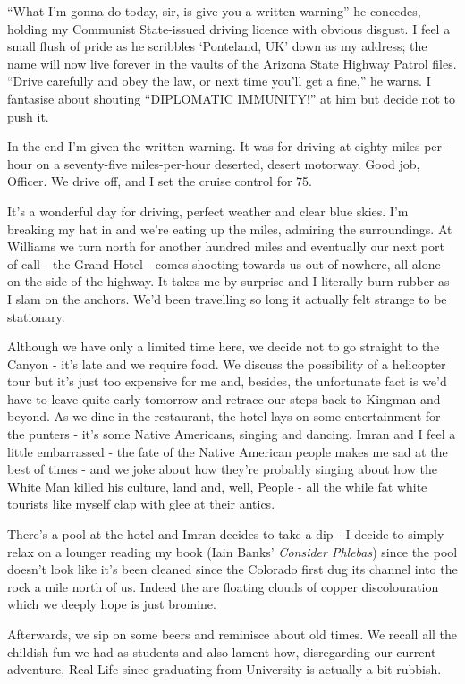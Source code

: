 \documentclass[a5paper,titlepage,11pt]{book}
\begin{document}
``What I'm gonna do today, sir, is give you a written warning'' he concedes, holding my Communist State-issued driving licence with obvious disgust.  I feel a small flush of pride as he scribbles `Ponteland, UK' down as my address; the name will now live forever in the vaults of the Arizona State Highway Patrol files.  ``Drive carefully and obey the law, or next time you'll get a fine,'' he warns.  I fantasise about shouting ``DIPLOMATIC IMMUNITY!'' at him but decide not to push it.

In the end I'm given the written warning.  It was for driving at eighty miles-per-hour on a seventy-five miles-per-hour deserted, desert motorway.  Good job, Officer.  We drive off, and I set the cruise control for 75.

It's a wonderful day for driving, perfect weather and clear blue skies.  I'm breaking my hat in and we're eating up the miles, admiring the surroundings.  At Williams we turn north for another hundred miles and eventually our next port of call - the Grand Hotel - comes shooting towards us out of nowhere, all alone on the side of the highway.  It takes me by surprise and I literally burn rubber as I slam on the anchors.  We'd been travelling so long it actually felt strange to be stationary.

Although we have only a limited time here, we decide not to go straight to the Canyon - it's late and we require food.  We discuss the possibility of a helicopter tour but it's just too expensive for me and, besides, the unfortunate fact is we'd have to leave quite early tomorrow and retrace our steps back to Kingman and beyond.  As we dine in the restaurant, the hotel lays on some entertainment for the punters - it's some Native Americans, singing and dancing.  Imran and I feel a little embarrassed - the fate of the Native American people makes me sad at the best of times - and we joke about how they're probably singing about how the White Man killed his culture, land and, well, People - all the while fat white tourists like myself clap with glee at their antics.

There's a pool at the hotel and Imran decides to take a dip - I decide to simply relax on a lounger reading my book (Iain Banks' \emph{Consider Phlebas}) since the pool doesn't look like it's been cleaned since the Colorado first dug its channel into the rock a mile north of us.  Indeed the are floating clouds of copper discolouration which we deeply hope is just bromine.

Afterwards, we sip on some beers and reminisce about old times.  We recall all the childish fun we had as students and also lament how, disregarding our current adventure, Real Life since graduating from University is actually a bit rubbish.
\end{document}
